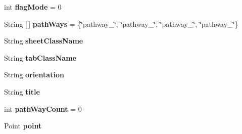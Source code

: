 \begin{DoxyCompactItemize}
int {\bfseries flag\+Mode} = 0
\item 
\hypertarget{classcom_1_1zeuslearning_1_1automation_1_1unittests_1_1Cengage__4844_a247737e8e182a31307bb9b26aacba3e5}{}\label{classcom_1_1zeuslearning_1_1automation_1_1unittests_1_1Cengage__4844_a247737e8e182a31307bb9b26aacba3e5} 
String \mbox{[}$\,$\mbox{]} {\bfseries path\+Ways} = \{\char`\"{}pathway\+\_\char`\"{}, \char`\"{}pathway\+\_\char`\"{}, \char`\"{}pathway\+\_\char`\"{}, \char`\"{}pathway\+\_\char`\"{}\}
\item 
\hypertarget{classcom_1_1zeuslearning_1_1automation_1_1unittests_1_1Cengage__4844_a7631d6852f890cb86c3fec84cc896e70}{}\label{classcom_1_1zeuslearning_1_1automation_1_1unittests_1_1Cengage__4844_a7631d6852f890cb86c3fec84cc896e70} 
String {\bfseries sheet\+Class\+Name}
\item 
\hypertarget{classcom_1_1zeuslearning_1_1automation_1_1unittests_1_1Cengage__4844_ac79dafa637be43e09e4dc1c6c92142f1}{}\label{classcom_1_1zeuslearning_1_1automation_1_1unittests_1_1Cengage__4844_ac79dafa637be43e09e4dc1c6c92142f1} 
String {\bfseries tab\+Class\+Name}
\item 
\hypertarget{classcom_1_1zeuslearning_1_1automation_1_1unittests_1_1Cengage__4844_aa6d75a6689b74f72c6cac600f574f83d}{}\label{classcom_1_1zeuslearning_1_1automation_1_1unittests_1_1Cengage__4844_aa6d75a6689b74f72c6cac600f574f83d} 
String {\bfseries orientation}
\item 
\hypertarget{classcom_1_1zeuslearning_1_1automation_1_1unittests_1_1Cengage__4844_ac9c2ab568ce8d89943e7e49c63dedecf}{}\label{classcom_1_1zeuslearning_1_1automation_1_1unittests_1_1Cengage__4844_ac9c2ab568ce8d89943e7e49c63dedecf} 
String {\bfseries title}
\item 
\hypertarget{classcom_1_1zeuslearning_1_1automation_1_1unittests_1_1Cengage__4844_a5b69c08ed978039732cae01501e1dc64}{}\label{classcom_1_1zeuslearning_1_1automation_1_1unittests_1_1Cengage__4844_a5b69c08ed978039732cae01501e1dc64} 
int {\bfseries path\+Way\+Count} = 0
\item 
\hypertarget{classcom_1_1zeuslearning_1_1automation_1_1unittests_1_1Cengage__4844_aaa1208fdba02f8b478e93b4733e678d9}{}\label{classcom_1_1zeuslearning_1_1automation_1_1unittests_1_1Cengage__4844_aaa1208fdba02f8b478e93b4733e678d9} 
Point {\bfseries point}
\item 
\hypertarget{classcom_1_1zeuslearning_1_1automation_1_1unittests_1_1Cengage__4844_a9d6c3c8ad03c4b25b6fd960a8f95fc74}{}\label{classcom_1_1zeuslearning_1_1automation_1_1unittests_1_1Cengage__4844_a9d6c3c8ad03c4b25b6fd960a8f95fc74} 

\end{DoxyCompactItemize}
